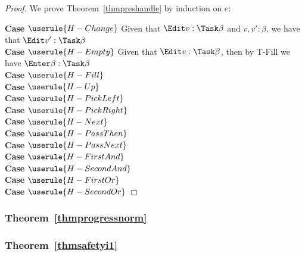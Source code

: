 \begin{proof}
  We prove Theorem~\ref{thmpreshandle} by induction on $e$:

  \noindent\textbf{Case} $\userule{H-Change}$ Given that $\Edit v:\Task\beta$ and $v,v':\beta$, we have that $\Edit v':\Task\beta$\\

  \noindent\textbf{Case} $\userule{H-Empty}$ Given that $\Edit v:\Task\beta$, then by T-Fill we have $\Enter \beta:\Task\beta$ \\

  \noindent\textbf{Case} $\userule{H-Fill}$ \\

  \noindent\textbf{Case} $\userule{H-Up}$ \\

  \noindent\textbf{Case} $\userule{H-PickLeft}$ \\

  \noindent\textbf{Case} $\userule{H-PickRight}$ \\

  \noindent\textbf{Case} $\userule{H-Next}$ \\

  \noindent\textbf{Case} $\userule{H-PassThen}$ \\

  \noindent\textbf{Case} $\userule{H-PassNext}$ \\

  \noindent\textbf{Case} $\userule{H-FirstAnd}$ \\

  \noindent\textbf{Case} $\userule{H-SecondAnd}$ \\

  \noindent\textbf{Case} $\userule{H-FirstOr}$ \\

  \noindent\textbf{Case} $\userule{H-SecondOr}$
\end{proof}

\subsubsection{Theorem~\ref{thmprogressnorm}}

\subsubsection{Theorem~\ref{thmsafetyi1}}

